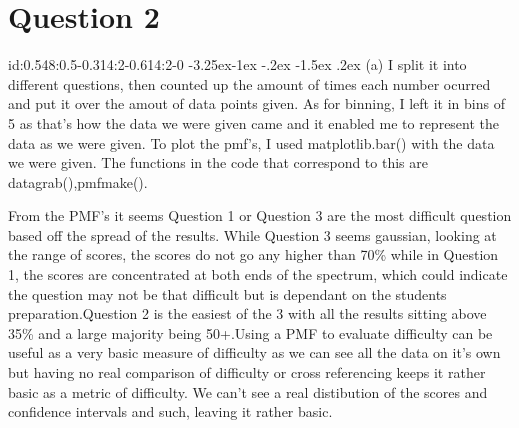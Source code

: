 \documentclass[10pt]{article} %
\makeatletter
\renewcommand\subsection{\@startsection{subsection}{2}{\z@}%
                                     {-3.25ex\@plus -1ex \@minus -.2ex}%
                                     {-1.5ex \@plus .2ex}%
                                     {\normalfont\large\bfseries}}
\makeatother
\begin{document}
\section{Question 2} id:0.548:0.5-0.314:2-0.614:2-0
\subsection{(a)}
I split it into different questions, then counted up the amount of times each number ocurred and put it over the amout of data points given. As for binning, I left it in bins of 5 as that's how the data we were given came and it enabled me to represent the data as we were given. To plot the pmf's, I used matplotlib.bar() with the data we were given. The functions in the code that correspond to this are datagrab(),pmfmake().
\begin{figure}[h]
    \centering
    \qquad
     \qquad
    \label{fig:example}
\end{figure}
From the PMF's it seems Question 1 or Question 3 are the most difficult question based off the spread of the results. While Question 3 seems gaussian, looking at the range of scores, the scores do not go any higher than 70\% while in Question 1, the scores are concentrated at both ends of the spectrum, which could indicate the question may not be that difficult but is dependant on the students preparation.Question 2 is the easiest of the 3 with all the results sitting above 35\% and a large majority being 50+.Using a PMF to evaluate difficulty can be useful as a very basic measure of difficulty as we can see all the data on it's own but having no real comparison of difficulty or cross referencing keeps it rather basic as a metric of difficulty. We can't see a real distibution of the scores and confidence intervals and such, leaving it rather basic.
\end{document}
